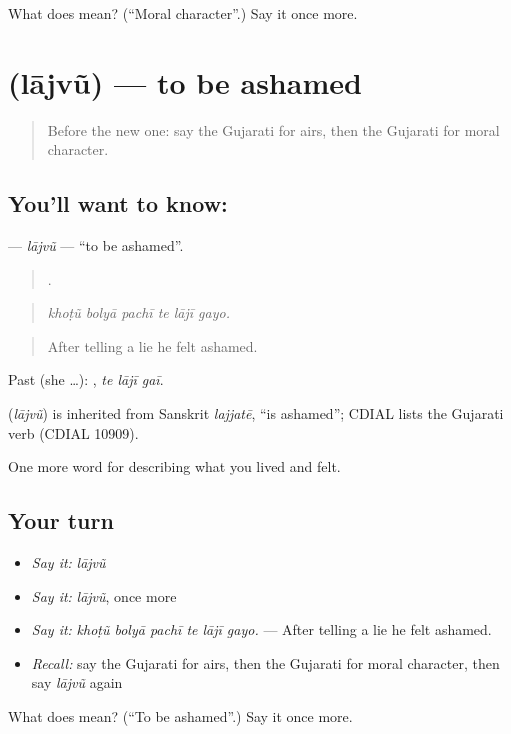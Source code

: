 \begin{tcolorbox}[breakable,colback=teal!4,colframe=teal!35!black,title={Before you move on}]
What does  mean? (\textquotedblleft{}Moral character\textquotedblright{}.) Say it once more.
\end{tcolorbox}
\section[\texorpdfstring{\gu{લાજવું} (lājvũ)}{લાજવું (lājvũ)}]{ (lājvũ) — to be ashamed}

\label{lesson:GU-C467-lajvu}



\begin{quote}
Before the new one: say the Gujarati for airs, then the Gujarati for moral character.
\end{quote}

\subsection*{You'll want to know: }
\textbf{} — \emph{lājvũ} — \textquotedblleft{}to be ashamed\textquotedblright{}.

\begin{quote}
     .
\end{quote}

\begin{quote}
\emph{khoṭũ bolyā pachī te lājī gayo.}
\end{quote}

\begin{quote}
After telling a lie he felt ashamed.
\end{quote}

Past (she …):   , \emph{te lājī gaī}.

\begin{cousinweb}
\textbf{} (\emph{lājvũ}) is inherited from Sanskrit \emph{lajjatē}, \textquotedblleft{}is ashamed\textquotedblright{}; CDIAL lists the Gujarati verb (CDIAL 10909).
\end{cousinweb}

\begin{grammarlens}[title={What you've built}]
One more word for describing what you lived and felt.
\end{grammarlens}

\subsection*{Your turn}
\begin{itemize}
\raggedright
  \item \emph{Say it:} \emph{lājvũ}
  \item \emph{Say it:} \emph{lājvũ}, once more
  \item \emph{Say it:} \emph{khoṭũ bolyā pachī te lājī gayo.} — After telling a lie he felt ashamed.
  \item \emph{Recall:} say the Gujarati for airs, then the Gujarati for moral character, then say \emph{lājvũ} again
\end{itemize}

\begin{tcolorbox}[breakable,colback=teal!4,colframe=teal!35!black,title={Before you move on}]
What does  mean? (\textquotedblleft{}To be ashamed\textquotedblright{}.) Say it once more.
\end{tcolorbox}

